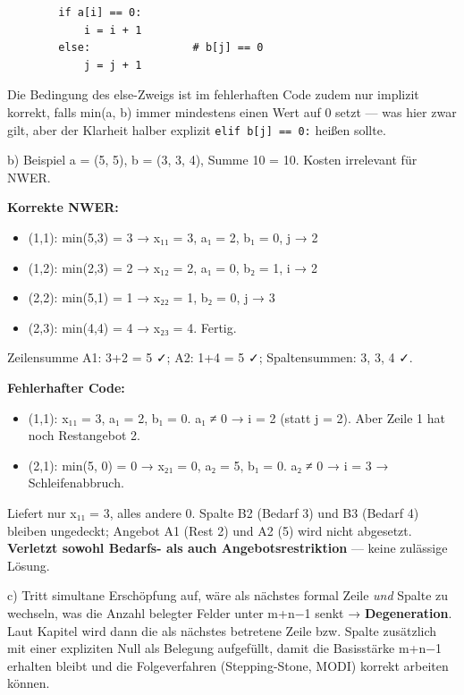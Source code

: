\documentclass[11pt, a4paper]{article}
\begin{document}
\begin{lstlisting}
        if a[i] == 0:
            i = i + 1
        else:                # b[j] == 0
            j = j + 1
\end{lstlisting}


Die Bedingung des else-Zweigs ist im fehlerhaften Code zudem nur implizit korrekt, falls min(a, b) immer mindestens einen Wert auf 0 setzt — was hier zwar gilt, aber der Klarheit halber explizit \texttt{elif b[j] == 0:} heißen sollte.


b) Beispiel a = (5, 5), b = (3, 3, 4), Summe 10 = 10. Kosten irrelevant für NWER.


\textbf{Korrekte NWER:}

\begin{itemize}
  \item (1,1): min(5,3) = 3 → x₁₁ = 3, a₁ = 2, b₁ = 0, j → 2
  \item (1,2): min(2,3) = 2 → x₁₂ = 2, a₁ = 0, b₂ = 1, i → 2
  \item (2,2): min(5,1) = 1 → x₂₂ = 1, b₂ = 0, j → 3
  \item (2,3): min(4,4) = 4 → x₂₃ = 4. Fertig.
\end{itemize}

Zeilensumme A1: 3+2 = 5 ✓; A2: 1+4 = 5 ✓; Spaltensummen: 3, 3, 4 ✓.


\textbf{Fehlerhafter Code:}

\begin{itemize}
  \item (1,1): x₁₁ = 3, a₁ = 2, b₁ = 0. a₁ ≠ 0 → i = 2 (statt j = 2). Aber Zeile 1 hat noch Restangebot 2.
  \item (2,1): min(5, 0) = 0 → x₂₁ = 0, a₂ = 5, b₁ = 0. a₂ ≠ 0 → i = 3 → Schleifenabbruch.
\end{itemize}

Liefert nur x₁₁ = 3, alles andere 0. Spalte B2 (Bedarf 3) und B3 (Bedarf 4) bleiben ungedeckt; Angebot A1 (Rest 2) und A2 (5) wird nicht abgesetzt. \textbf{Verletzt sowohl Bedarfs- als auch Angebotsrestriktion} — keine zulässige Lösung.


c) Tritt simultane Erschöpfung auf, wäre als nächstes formal Zeile \textit{und} Spalte zu wechseln, was die Anzahl belegter Felder unter m+n−1 senkt → \textbf{Degeneration}. Laut Kapitel wird dann die als nächstes betretene Zeile bzw. Spalte zusätzlich mit einer expliziten Null als Belegung aufgefüllt, damit die Basisstärke m+n−1 erhalten bleibt und die Folgeverfahren (Stepping-Stone, MODI) korrekt arbeiten können.





\end{document}
